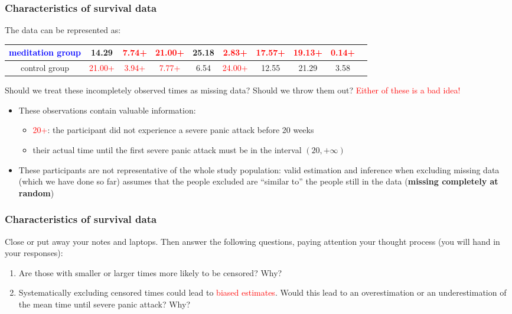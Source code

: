 \documentclass[12pt, 
hyperref={colorlinks=true, linkcolor=blue, urlcolor=cyan},dvipsnames]{beamer}
\begin{document}
\begin{frame}
\frametitle{Characteristics of survival data}
{\fontsize{10pt}{7.2}\selectfont
The data can be represented as:
\hspace*{-1cm}\begin{tabular}{|c|c|c|c|c|c|c|c|c|c|}
\hline
\textcolor{blue}{meditation group} & 14.29  & \textcolor{red}{7.74+} & \textcolor{red}{21.00+} & 25.18  &  \textcolor{red}{2.83+} & \textcolor{red}{17.57+} & \textcolor{red}{19.13+} &  \textcolor{red}{0.14+}  \\
\hline
control group & \textcolor{red}{21.00+} &  \textcolor{red}{3.94+} &  \textcolor{red}{7.77+} &  6.54  & \textcolor{red}{24.00+} & 12.55  & 21.29 &  3.58 \\
\hline
\end{tabular}
}

\vspace{-0.6cm}
{\small
Should we treat these incompletely observed times as missing data? Should we throw them out? \pause \textcolor{red}{Either of these is a bad idea!} \vspace{-0.3cm}

\begin{itemize}
\item These observations contain valuable information:
{\scriptsize
\begin{itemize}
\item \textcolor{red}{20+}: the participant did not experience a severe panic attack before 20 weeks
\item their actual time until the first severe panic attack must be in the interval $(20, +\infty)$
\end{itemize}
}
\item These participants are not representative of the whole study population: valid estimation and inference when excluding missing data (which we have done so far) assumes that the people excluded are ``similar to'' the people still in the data (\textbf{missing completely at random})
\end{itemize}
}
\end{frame}

\begin{frame}
\frametitle{Characteristics of survival data}
Close or put away your notes and laptops. Then answer the following questions, paying attention your thought process (you will hand in your responses):
\begin{enumerate}
\item Are those with smaller or larger times more likely to be censored? Why?
\item Systematically excluding censored times could lead to \textcolor{red}{biased estimates}. Would this lead to an overestimation or an underestimation of the mean time until severe panic attack? Why?
\end{enumerate}

\end{frame}
\end{document}
